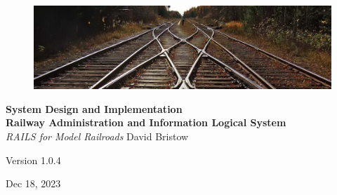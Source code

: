 \documentclass[letterpaper, oneside, 11pt]{book}
\begin{document}
\begin{titlepage}
	\raggedleft
	\begin{figure}[H]
	\centering
		\includegraphics[scale=1.53]{railway_track.jpg}
	\label{fig:track}
\end{figure}
	\vspace*{0.167\textheight}
	\textbf{\LARGE System Design and Implementation}\\[\baselineskip]
    \textbf{\textcolor{MyBlue}{\Huge R\Large ailway \Huge A\Large dministration and \Huge I\Large nformation \Huge L\Large ogical \Huge S\Large ystem}}\\[\baselineskip]
	{\Large \textit{RAILS for Model Railroads}}
	\vfill
    \vspace*{\baselineskip}
	{\small David Bristow}

	{\small Version 1.0.4}
	
	{\small Dec 18, 2023}
	\vspace*{3\baselineskip}
\end{titlepage}
\tableofcontents







\backmatter


\end{document}
